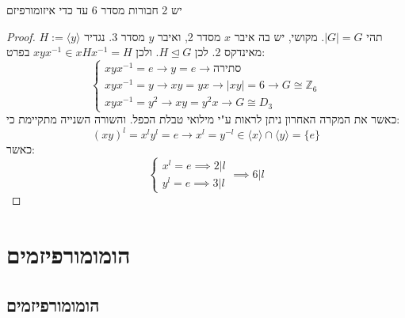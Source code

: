 \documentclass{tstextbook}
\begin{document}
\begin{proposition}
יש 2 חבורות מסדר 6 עד כדי איזומורפיזם

\end{proposition}
\begin{proof}
תהי \(|G|=G\). מקושי, יש בה איבר \(x\)  מסדר 2, ואיבר \(y\) מסדר 3. נגדיר \(H:=\langle y\rangle\) מאינדקס 2. לכן \(H\trianglelefteq G\). ולכן \(xyx ^{-1}\in xHx ^{-1}=H\)
בפרט:
$$\begin{cases}xyx^{-1} =e\to y=e\to \text{סתירה} \\xyx^{-1} =y\to xy=yx \to |xy|=6 \to G \cong \mathbb{Z}_{6} \\xyx^{-1} =y^2 \to xy=y^2x \to  G\cong D_{3}
\end{cases}$$
כאשר את המקרה האחרון ניתן לראות ע"י מילואי טבלת הכפל.
והשורה השנייה מתקיימת כי:
$$(xy)^l=x^ly^l=e\to x^l=y^{-l}\in \langle x\rangle \cap \langle y\rangle =\{ e \}$$
כאשר:
$$\begin{cases}x^l=e\implies 2|l \\y^l=e\implies 3|l
\end{cases}\implies 6|l$$

\end{proof}
\chapter{הומומורפיזמים}

\section{הומומורפיזמים}
\end{document}
